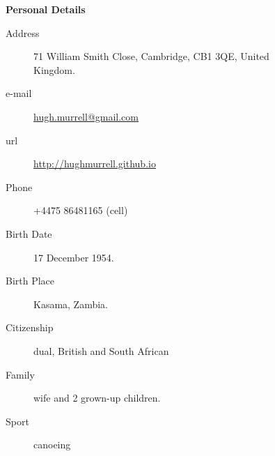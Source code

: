 \begin{description}\item[] \begin{description}\item[] {\large \bf   Personal Details  }
\begin{description}
\item[Address]  71 William Smith Close, Cambridge, CB1 3QE, United Kingdom.
\item[e-mail]  \url{hugh.murrell@gmail.com}
\item[url]  \url{http://hughmurrell.github.io}
\item[Phone]  +4475 86481165 (cell)
\item[Birth Date]  17 December 1954.
\item[Birth Place]  Kasama, Zambia.
\item[Citizenship]  dual, British and South African
\item[Family]  wife and 2 grown-up children.
\item[Sport]  canoeing 
\end{description}
\end{description}
\end{description}
\label{f0}
